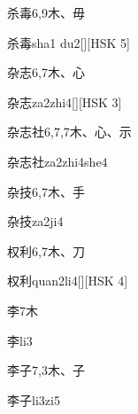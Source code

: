 \begin{entry}{杀毒}{6,9}{⽊、⽏}
  \begin{phonetics}{杀毒}{sha1 du2}[][HSK 5]
  \end{phonetics}
\end{entry}

\begin{entry}{杂志}{6,7}{⽊、⼼}
  \begin{phonetics}{杂志}{za2zhi4}[][HSK 3]
  \end{phonetics}
\end{entry}

\begin{entry}{杂志社}{6,7,7}{⽊、⼼、⽰}
  \begin{phonetics}{杂志社}{za2zhi4she4}
  \end{phonetics}
\end{entry}

\begin{entry}{杂技}{6,7}{⽊、⼿}
  \begin{phonetics}{杂技}{za2ji4}
  \end{phonetics}
\end{entry}

\begin{entry}{权利}{6,7}{⽊、⼑}
  \begin{phonetics}{权利}{quan2li4}[][HSK 4]
  \end{phonetics}
\end{entry}

\begin{entry}{李}{7}{⽊}
  \begin{phonetics}{李}{li3}
  \end{phonetics}
\end{entry}

\begin{entry}{李子}{7,3}{⽊、⼦}
  \begin{phonetics}{李子}{li3zi5}
  \end{phonetics}
\end{entry}

